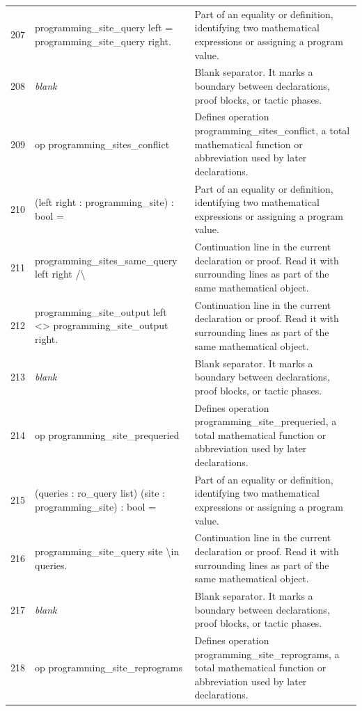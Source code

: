 \documentclass[10pt]{article}
\begin{document}
\begin{longtable}{r L{0.53\textwidth} L{0.37\textwidth}}
207 & {\ttfamily\scriptsize   programming\_site\_query left = programming\_site\_query right.} & Part of an equality or definition, identifying two mathematical expressions or assigning a program value. \\
208 & {\ttfamily\scriptsize \emph{blank}} & Blank separator.  It marks a boundary between declarations, proof blocks, or tactic phases. \\
209 & {\ttfamily\scriptsize op programming\_sites\_conflict} & Defines operation programming\_sites\_conflict, a total mathematical function or abbreviation used by later declarations. \\
210 & {\ttfamily\scriptsize    (left right : programming\_site) : bool =} & Part of an equality or definition, identifying two mathematical expressions or assigning a program value. \\
211 & {\ttfamily\scriptsize   programming\_sites\_same\_query left right /\textbackslash{}} & Continuation line in the current declaration or proof.  Read it with surrounding lines as part of the same mathematical object. \\
212 & {\ttfamily\scriptsize   programming\_site\_output left <> programming\_site\_output right.} & Continuation line in the current declaration or proof.  Read it with surrounding lines as part of the same mathematical object. \\
213 & {\ttfamily\scriptsize \emph{blank}} & Blank separator.  It marks a boundary between declarations, proof blocks, or tactic phases. \\
214 & {\ttfamily\scriptsize op programming\_site\_prequeried} & Defines operation programming\_site\_prequeried, a total mathematical function or abbreviation used by later declarations. \\
215 & {\ttfamily\scriptsize    (queries : ro\_query list) (site : programming\_site) : bool =} & Part of an equality or definition, identifying two mathematical expressions or assigning a program value. \\
216 & {\ttfamily\scriptsize   programming\_site\_query site \textbackslash{}in queries.} & Continuation line in the current declaration or proof.  Read it with surrounding lines as part of the same mathematical object. \\
217 & {\ttfamily\scriptsize \emph{blank}} & Blank separator.  It marks a boundary between declarations, proof blocks, or tactic phases. \\
218 & {\ttfamily\scriptsize op programming\_site\_reprograms} & Defines operation programming\_site\_reprograms, a total mathematical function or abbreviation used by later declarations. \\

\end{longtable}
\end{document}
